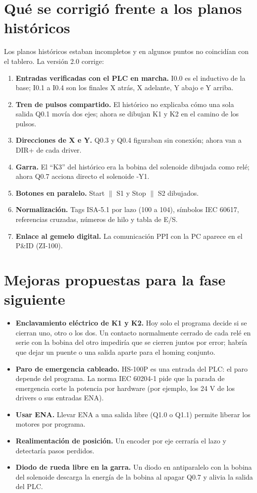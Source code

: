 \documentclass[11pt]{article}
\begin{document}
\section{Qué se corrigió frente a los planos históricos}\label{sec:cambios}
Los planos históricos estaban incompletos y en algunos puntos no coincidían con el tablero. La versión 2.0 corrige:
\begin{enumerate}
\item \textbf{Entradas verificadas con el PLC en marcha.} I0.0 es el inductivo de la base; I0.1 a I0.4 son los finales X atrás, X adelante, Y abajo e Y arriba.
\item \textbf{Tren de pulsos compartido.} El histórico no explicaba cómo una sola salida Q0.1 movía dos ejes; ahora se dibujan K1 y K2 en el camino de los pulsos.
\item \textbf{Direcciones de X e Y.} Q0.3 y Q0.4 figuraban sin conexión; ahora van a DIR+ de cada driver.
\item \textbf{Garra.} El ``K3'' del histórico era la bobina del solenoide dibujada como relé; ahora Q0.7 acciona directo el solenoide -Y1.
\item \textbf{Botones en paralelo.} Start $\parallel$ S1 y Stop $\parallel$ S2 dibujados.
\item \textbf{Normalización.} Tags ISA-5.1 por lazo (100 a 104), símbolos IEC 60617, referencias cruzadas, números de hilo y tabla de E/S.
\item \textbf{Enlace al gemelo digital.} La comunicación PPI con la PC aparece en el P\&ID (ZI-100).
\end{enumerate}

\section{Mejoras propuestas para la fase siguiente}\label{sec:mejoras}
\begin{itemize}
\item \textbf{Enclavamiento eléctrico de K1 y K2.} Hoy solo el programa decide si se cierran uno, otro o los dos. Un contacto normalmente cerrado de cada relé en serie con la bobina del otro impediría que se cierren juntos por error; habría que dejar un puente o una salida aparte para el homing conjunto.
\item \textbf{Paro de emergencia cableado.} HS-100P es una entrada del PLC: el paro depende del programa. La norma IEC 60204-1 pide que la parada de emergencia corte la potencia por hardware (por ejemplo, los 24 V de los drivers o sus entradas ENA).
\item \textbf{Usar ENA.} Llevar ENA a una salida libre (Q1.0 o Q1.1) permite liberar los motores por programa.
\item \textbf{Realimentación de posición.} Un encoder por eje cerraría el lazo y detectaría pasos perdidos.
\item \textbf{Diodo de rueda libre en la garra.} Un diodo en antiparalelo con la bobina del solenoide descarga la energía de la bobina al apagar Q0.7 y alivia la salida del PLC.
\end{itemize}

\vfill
{}
\end{document}
